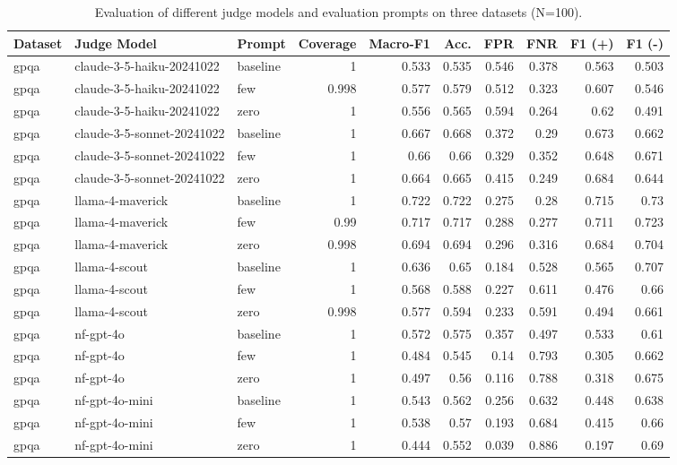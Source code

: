 \begin{table}[htbp]
\caption{Evaluation of different judge models and evaluation prompts on three datasets (N=100).}
\label{tab:expevaluni}
\begin{tabular}{lllrrrrrrr}
\toprule
Dataset & Judge Model & Prompt & Coverage & Macro-F1 & Acc. & FPR & FNR & F1 (+) & F1 (-) \\
\midrule
gpqa & claude-3-5-haiku-20241022 & baseline & 1 & 0.533 & 0.535 & 0.546 & 0.378 & 0.563 & 0.503 \\
gpqa & claude-3-5-haiku-20241022 & few & 0.998 & 0.577 & 0.579 & 0.512 & 0.323 & 0.607 & 0.546 \\
gpqa & claude-3-5-haiku-20241022 & zero & 1 & 0.556 & 0.565 & 0.594 & 0.264 & 0.62 & 0.491 \\
gpqa & claude-3-5-sonnet-20241022 & baseline & 1 & 0.667 & 0.668 & 0.372 & 0.29 & 0.673 & 0.662 \\
gpqa & claude-3-5-sonnet-20241022 & few & 1 & 0.66 & 0.66 & 0.329 & 0.352 & 0.648 & 0.671 \\
gpqa & claude-3-5-sonnet-20241022 & zero & 1 & 0.664 & 0.665 & 0.415 & 0.249 & 0.684 & 0.644 \\
gpqa & llama-4-maverick & baseline & 1 & 0.722 & 0.722 & 0.275 & 0.28 & 0.715 & 0.73 \\
gpqa & llama-4-maverick & few & 0.99 & 0.717 & 0.717 & 0.288 & 0.277 & 0.711 & 0.723 \\
gpqa & llama-4-maverick & zero & 0.998 & 0.694 & 0.694 & 0.296 & 0.316 & 0.684 & 0.704 \\
gpqa & llama-4-scout & baseline & 1 & 0.636 & 0.65 & 0.184 & 0.528 & 0.565 & 0.707 \\
gpqa & llama-4-scout & few & 1 & 0.568 & 0.588 & 0.227 & 0.611 & 0.476 & 0.66 \\
gpqa & llama-4-scout & zero & 0.998 & 0.577 & 0.594 & 0.233 & 0.591 & 0.494 & 0.661 \\
gpqa & nf-gpt-4o & baseline & 1 & 0.572 & 0.575 & 0.357 & 0.497 & 0.533 & 0.61 \\
gpqa & nf-gpt-4o & few & 1 & 0.484 & 0.545 & 0.14 & 0.793 & 0.305 & 0.662 \\
gpqa & nf-gpt-4o & zero & 1 & 0.497 & 0.56 & 0.116 & 0.788 & 0.318 & 0.675 \\
gpqa & nf-gpt-4o-mini & baseline & 1 & 0.543 & 0.562 & 0.256 & 0.632 & 0.448 & 0.638 \\
gpqa & nf-gpt-4o-mini & few & 1 & 0.538 & 0.57 & 0.193 & 0.684 & 0.415 & 0.66 \\
gpqa & nf-gpt-4o-mini & zero & 1 & 0.444 & 0.552 & 0.039 & 0.886 & 0.197 & 0.69 \\

\end{tabular}
\end{table}
